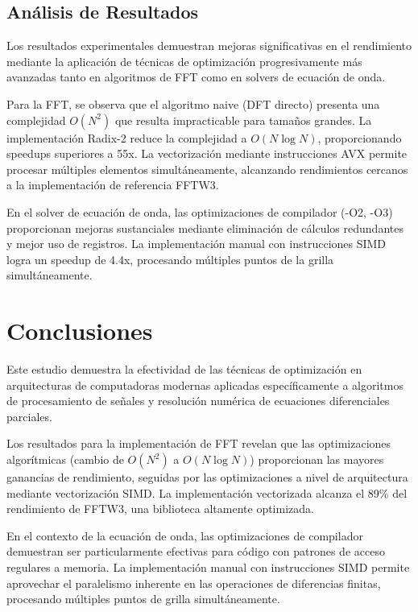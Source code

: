 \documentclass[a4paper]{article}
\begin{document}
\subsection{Análisis de Resultados}

Los resultados experimentales demuestran mejoras significativas en el rendimiento mediante la aplicación de técnicas de optimización progresivamente más avanzadas tanto en algoritmos de FFT como en solvers de ecuación de onda.

Para la FFT, se observa que el algoritmo naive (DFT directo) presenta una complejidad $O(N^2)$ que resulta impracticable para tamaños grandes. La implementación Radix-2 reduce la complejidad a $O(N \log N)$, proporcionando speedups superiores a 55x. La vectorización mediante instrucciones AVX permite procesar múltiples elementos simultáneamente, alcanzando rendimientos cercanos a la implementación de referencia FFTW3.

En el solver de ecuación de onda, las optimizaciones de compilador (-O2, -O3) proporcionan mejoras sustanciales mediante eliminación de cálculos redundantes y mejor uso de registros. La implementación manual con instrucciones SIMD logra un speedup de 4.4x, procesando múltiples puntos de la grilla simultáneamente.

\section{Conclusiones}

Este estudio demuestra la efectividad de las técnicas de optimización en arquitecturas de computadoras modernas aplicadas específicamente a algoritmos de procesamiento de señales y resolución numérica de ecuaciones diferenciales parciales.

Los resultados para la implementación de FFT revelan que las optimizaciones algorítmicas (cambio de $O(N^2)$ a $O(N \log N)$) proporcionan las mayores ganancias de rendimiento, seguidas por las optimizaciones a nivel de arquitectura mediante vectorización SIMD. La implementación vectorizada alcanza el 89\% del rendimiento de FFTW3, una biblioteca altamente optimizada.

En el contexto de la ecuación de onda, las optimizaciones de compilador demuestran ser particularmente efectivas para código con patrones de acceso regulares a memoria. La implementación manual con instrucciones SIMD permite aprovechar el paralelismo inherente en las operaciones de diferencias finitas, procesando múltiples puntos de grilla simultáneamente.
\end{document}
